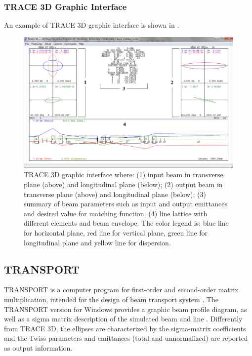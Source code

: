 \subsubsection{TRACE 3D Graphic Interface}
\label{ssec:T3D_graphic}
An example of TRACE 3D graphic interface is shown in .
\begin{figure}[!htb]
\centering
  \includegraphics[width=\textwidth-1cm, keepaspectratio=true]{figures/Benchmarks/Trace.png}
    \caption{TRACE 3D graphic interface where: (1) input beam in transverse plane (above) and longitudinal plane (below); (2) output beam in transverse plane (above) and longitudinal plane (below); (3) summary of beam parameters such as input and output emittances and desired value for matching function; (4) line lattice with different elements and beam envelope. The color legend is: blue line for horizontal plane, red line for vertical plane, green line for longitudinal plane and yellow line for dispersion.}
    \label{fig:trace}
\end{figure}
\clearpage
\subsection{TRANSPORT}
\label{sec:TRAN}
TRANSPORT is a computer program for first-order and second-order matrix multiplication, intended for the design of beam transport system \cite{bib:transport}. The TRANSPORT version for Windows provides a graphic beam profile diagram, as well as a sigma matrix description of the simulated beam and line \cite{Transport_GUI}.
Differently from TRACE 3D, the ellipses are characterized by the sigma-matrix coefficients and the Twiss parameters and emittances (total and unnormalized) are reported as output information.
